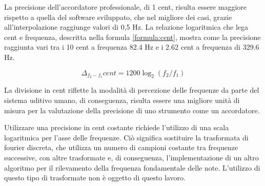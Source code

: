 La precisione dell'accordatore professionale, di 1 cent, risulta essere maggiore rispetto a quella del software sviluppato, che nel migliore dei casi, grazie all'interpolazione raggiunge valori di 0,5 Hz.
La relazione logaritmica che lega cent e frequenza, descritta nella formula \ref{formula:cent}, mostra come la precisione raggiunta vari tra i 10 cent a frequenza 82.4 Hz e i 2.62 cent a frequenza di 329.6 Hz.

\begin{equation}\label{formula:cent}
		\Delta_{f_2-f_1} cent = 1200 \log_2 \left( f_2/f_1 \right)
	\end{equation} 

La divisione in cent riflette la modalità di percezione delle frequenze da parte del sistema uditivo umano, di conseguenza, risulta essere una migliore unità di misura per la valutazione della precisione di uno strumento come un accordatore.

Utilizzare una precisione in cent costante richiede l'utilizzo di una scala logaritmica per l'asse delle frequenze.
Ciò significa sostituire la trasformata di fourier discreta, che utilizza un numero di campioni costante tra frequenze successive, con altre trasformate e, di conseguenza, l'implementazione di un altro algoritmo per il rilevamento della frequenza fondamentale delle note.
L'utilizzo di questo tipo di trasformate non è oggetto di questo lavoro.

 

